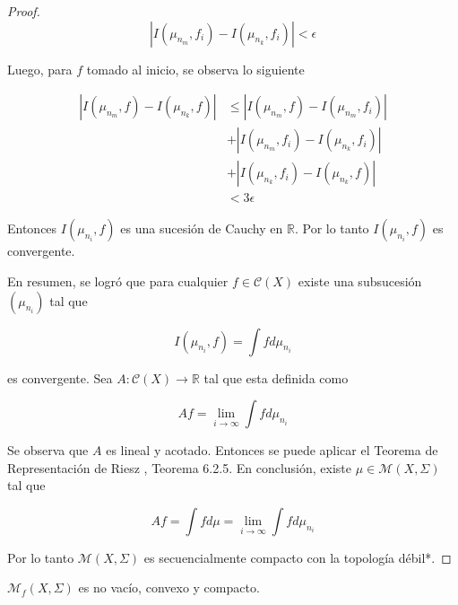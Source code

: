 \begin{proof}
	\begin{equation}
		|I(\mu_{n_m},f_i) - I(\mu_{n_k},f_i)| < \epsilon
	\end{equation}
	
	Luego, para $f$ tomado al inicio, se observa lo siguiente
	
	\begin{align}
		|I(\mu_{n_m},f) - I(\mu_{n_k},f)| &\leq |I(\mu_{n_m},f) - I(\mu_{n_m},f_i) | \\
		& + |I(\mu_{n_m},f_i) - I(\mu_{n_k},f_i)| \\		
		& + |I(\mu_{n_k},f_i) - I(\mu_{n_k},f)|\\
		& < 3\epsilon
	\end{align}
	
	Entonces $I(\mu_{n_i},f)$ es una sucesión de Cauchy en $\mathbb{R}$. Por lo tanto $I(\mu_{n_i},f)$ es convergente.
	
	En resumen, se logró que para cualquier $f \in \mathcal{C}(X)$ existe una subsucesión $(\mu_{n_i})$ tal que
	
	\begin{equation}
		I(\mu_{n_i},f) = \int f d\mu_{n_i}
	\end{equation}
	
	es convergente. Sea $A: \mathcal{C}(X) \rightarrow \mathbb{R}$ tal que esta definida como
	
	\begin{equation}
		Af = \lim_{i \rightarrow \infty} \int f d \mu_{n_i}
	\end{equation}
	
	Se observa que $A$ es lineal y acotado. Entonces se puede aplicar el Teorema de Representación de Riesz \cite{riesz}, Teorema 6.2.5. En conclusión, existe \mbox{$\mu \in \mathcal{M}(X,\Sigma)$} tal que
	
	\begin{equation}
		Af = \int f d\mu = \lim_{i \rightarrow \infty} \int f d \mu_{n_i}
	\end{equation}
	
	Por lo tanto $\mathcal{M}(X,\Sigma)$ es secuencialmente compacto con la topología débil*.
\end{proof}

\begin{teorema}\label{krylov-bugoliubov}
	$\mathcal{M}_f(X,\Sigma)$ es no vacío, convexo y compacto.
\end{teorema}

